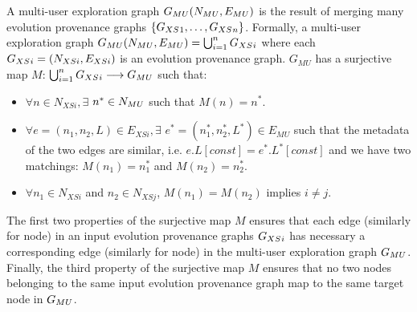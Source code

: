 \begin{definition}
\label{def:MUg}
A multi-user exploration graph $G_{MU}{}(N_{MU}{}, E_{MU}{})$ is the result of merging many evolution provenance graphs $\{G_{XS}{}_1, \ldots, G_{XS}{}_n\}$. 
Formally, a multi-user exploration graph $G_{MU}{}(N_{MU}{}, E_{MU}{}) =  \bigcup_{i=1}^n  G_{XS}{}_i$ where each $G_{XS}{}_i=(N_{XSi} ,E_{XSi} )$ is an evolution provenance graph.
$G_{MU}$ has a surjective map $M$: $\bigcup_{i=1}^n G_{XS}{}_i \longrightarrow G_{MU}{}$ such that:
\begin{itemize}
\item  $\forall n \in N_{XSi},  \exists$ $n^* \in N_{MU}{}$ such that $M(n)=n^*$.
\item  $\forall e=(n_1,n_2,L) \in E_{XSi},  \exists$ $e^*=(n^*_1,n^*_2,L^*) \in E_{MU}$ such that the metadata of the two edges are similar, i.e. $e.L[const]=e^*.L^*[const]$ and we have two matchings: $M(n_1)=n^*_1$ and $M(n_2)=n^*_2$. 
\item  $\forall n_1 \in N_{XSi}$ and $n_2 \in N_{XSj}$, $M(n_1)=M(n_2)$ implies $i \neq j$.
\end{itemize}

\end{definition}  
The first two properties of the surjective map $M$ ensures that each edge (similarly for node) in an input evolution provenance graphs $G_{XS}{}_i$ has necessary a corresponding edge (similarly for node) in the multi-user exploration graph $G_{MU}{}$. 
Finally, the third property of the surjective map $M$ ensures that no two nodes belonging to the same input evolution provenance graph map to the same target node in $G_{MU}{}$.


